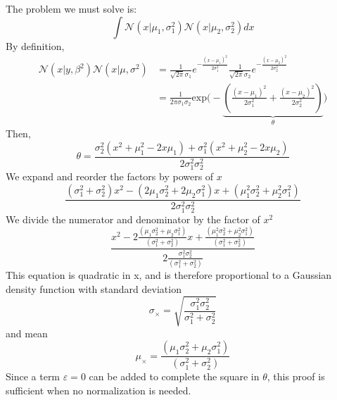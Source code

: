 \documentclass[article]{jss}
\newcommand{\N}{\mathcal{N}}
\begin{document}
The problem we must solve is:
\begin{equation}
 \int \N(x|\mu_1,\sigma_1^2)\N(x|\mu_2,\sigma_2^2) dx
\end{equation}
%
By definition,
\begin{equation}
\begin{split}
 \N(x|y,\beta^2)\N(x|\mu,\sigma^2) & = \frac{1}{\sqrt{2\pi}\sigma_1}e^{-\frac{(x-\mu_1)^2}{2\sigma_1^2}} \frac{1}{\sqrt{2\pi}\sigma_2}e^{-\frac{(x-\mu_2)^2}{2\sigma_2^2}}  \\
 & = \frac{1}{2\pi\sigma_1\sigma_2}\text{exp}\Bigg(-\underbrace{\left( \frac{(x-\mu_1)^2}{2\sigma_1^2} + \frac{(x-\mu_2)^2}{2\sigma_2^2} \right)}_{\theta} \Bigg)
\end{split}
\end{equation}
%
Then,
\begin{equation}
 \theta = \frac{\sigma_2^2(x^2 + \mu_1^2 - 2x\mu_1) + \sigma_1^2(x^2 + \mu_2^2 - 2x\mu_2) }{2\sigma_1^2\sigma_2^2}
\end{equation}
%
We expand and reorder the factors by powers of $x$
\begin{equation}
 \frac{(\sigma_1^2 + \sigma_2^2) x^2 - (2\mu_1\sigma_2^2 + 2\mu_2\sigma_1^2) x + (\mu_1^2\sigma_2^2 + \mu_2^2\sigma_1^2)}{2\sigma_1^2\sigma_2^2}
\end{equation}
%
We divide the numerator and denominator by the factor of $x^2$
\begin{equation}
 \frac{x^2 - 2\frac{(\mu_1\sigma_2^2 + \mu_2\sigma_1^2)}{(\sigma_1^2 + \sigma_2^2) } x + \frac{(\mu_1^2\sigma_2^2 + \mu_2^2\sigma_1^2)}{(\sigma_1^2 + \sigma_2^2) }}{2\frac{\sigma_1^2\sigma_2^2}{(\sigma_1^2 + \sigma_2^2)}}
\end{equation}
%
This equation is quadratic in x, and is therefore proportional to a Gaussian density function with standard deviation
\begin{equation}
\sigma_{\times} = \sqrt{\frac{\sigma_1^2\sigma_2^2}{\sigma_1^2+\sigma_2^2}}
\end{equation}
%
and mean
\begin{equation}
 \mu_{\times} = \frac{(\mu_1\sigma_2^2 + \mu_2\sigma_1^2)}{(\sigma_1^2 + \sigma_2^2) }
\end{equation}
%
Since a term $\varepsilon = 0$ can be added to complete the square in $\theta$, this proof is sufficient when no normalization is needed. 
\end{document}
